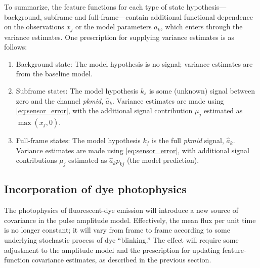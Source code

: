 \documentclass[10pt]{article}
\begin{document}
To summarize, the feature functions for each type of state hypothesis---background, subframe and full-frame---contain additional functional dependence on the observations $x_j$ or the model parameters $a_k$, which enters through the variance estimates.  One prescription for supplying variance estimates is as follows:
\begin{enumerate}
\item
Background state:  The model hypothesis is no signal; variance estimates are from the baseline model.
\item
Subframe states:  The model hypothesis $k_s$ is some (unknown) signal between zero and the channel \emph{pkmid}, $\hat{a}_k$.  Variance estimates are made using \eqref{eq:sensor_error}, with the additional signal contribution $\mu_j$ estimated as $\max(x_j,0)$.
\item
Full-frame states:  The model hypothesis $k_f$ is the full \emph{pkmid} signal, $\hat{a}_k$. Variance estimates are made using \eqref{eq:sensor_error}, with additional signal contributions $\mu_j$ estimated as $\hat{a}_k p_{kj}$ (the model prediction). 
\end{enumerate}

\subsection{Incorporation of dye photophysics}
\label{sec:photophysics}
The photophysics of fluorescent-dye emission will introduce a new source of covariance in the pulse amplitude model.
Effectively, the mean flux per unit time is no longer constant; it will vary from frame to frame according to some underlying stochastic process of dye ``blinking.''
The effect will require some adjustment to the amplitude model and the prescription for updating feature-function covariance estimates, as described in the previous section.
\end{document}
